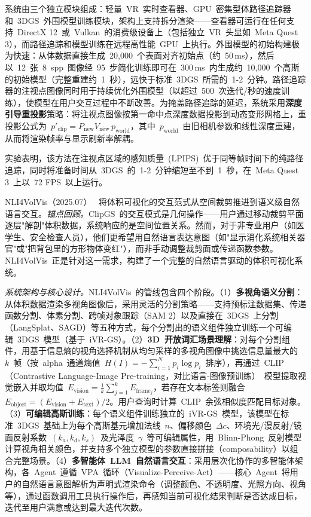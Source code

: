系统由三个独立模块组成：轻量~VR~实时查看器、GPU~密集型体路径追踪器和~3DGS~外围模型训练模块，架构上支持拆分渲染——查看器可运行在任何支持~DirectX 12~或~Vulkan~的消费级设备上（包括独立~VR~头显如~Meta Quest 3），而路径追踪和模型训练在远程高性能~GPU~上执行。外围模型的初始构建极为快速：从体数据直接生成~20,000~个表面对齐初始点（约~50\,ms），然后以~12~张~8~spp~图像经~95~步简化训练即可在~300\,ms~内生成约~10,000~个高斯的初始模型（完整重建约~1~秒），远快于标准~3DGS~所需的~1-2~分钟。路径追踪器的注视点图像同时用于持续优化外围模型（以超过~500~次迭代/秒的速度训练），使模型在用户交互过程中不断改善。为掩盖路径追踪的延迟，系统采用\textbf{深度引导重投影}策略：将注视点图像按第一命中点深度数据投影到动态变形网格上，重投影公式为~$p'_{\text{clip}} = P_{\text{new}}V_{\text{new}}\,p_{\text{world}}$，其中~$p_{\text{world}}$~由旧相机参数和线性深度重建，从而将渲染帧率与显示刷新率解耦。

实验表明，该方法在注视点区域的感知质量~(LPIPS)~优于同等帧时间下的纯路径追踪，同时将准备时间从~3DGS~的~1-2~分钟缩短至不到~1~秒，在~Meta Quest 3~上以~72 FPS~以上运行。

NLI4VolVis（2025.07）~\cite{2507_12621} 将体积可视化的交互范式从空间裁剪推进到语义级自然语言交互。\textit{锚点回顾。}ClipGS~的交互模式是几何操作——用户通过移动裁剪平面逐层"解剖"体积数据，系统响应的是空间位置关系。然而，对于非专业用户（如医学生、安全检查人员），他们更希望用自然语言表达意图（如"显示消化系统相关器官"或"把背包里的方形物体变红"），而非手动调整裁剪面或传递函数参数。NLI4VolVis~正是针对这一需求，构建了一个完整的自然语言驱动的体积可视化系统。

\textit{系统架构与核心设计。}NLI4VolVis~的管线包含四个阶段。（1）\textbf{多视角语义分割}：从体积数据渲染多视角图像后，采用灵活的分割策略——支持预标注数据集、传递函数分割、体素分割、跨帧对象跟踪（SAM 2）以及直接在~3DGS~上分割（LangSplat、SAGD）等五种方式，每个分割出的语义组件独立训练一个可编辑~3DGS~模型（基于~iVR-GS）。（2）\textbf{3D~开放词汇场景理解}：对每个分割组件，用基于信息熵的视角选择机制从均匀采样的多视角图像中挑选信息量最大的~$k$~帧（按~alpha~通道熵值~$H(I)=-\sum_{i=1}^{N} p_i \log p_i$~排序），再通过~CLIP（Contrastive Language-Image Pre-training，对比语言-图像预训练）~模型提取视觉嵌入并取均值~$E_{\text{vision}} = \frac{1}{k}\sum_{j=1}^{k} E_{\text{frame}_j}$，若存在文本标签则融合~$E_{\text{object}} = (E_{\text{vision}} + E_{\text{text}})/2$。用户查询时计算~CLIP~余弦相似度匹配目标对象。（3）\textbf{可编辑高斯训练}：每个语义组件训练独立的~iVR-GS~模型，该模型在标准~3DGS~基础上为每个高斯基元增加法线~$n$、偏移颜色~$\Delta c$、环境光/漫反射/镜面反射系数~$(k_a, k_d, k_s)$~及光泽度~$\gamma$~等可编辑属性，用~Blinn-Phong~反射模型计算视角相关颜色，并支持多个独立模型的参数直接拼接（composability）以组合完整场景。（4）\textbf{多智能体~LLM~自然语言交互}：采用层次化协作的多智能体架构，各~Agent~遵循~VPA~循环（Visualize-Perceive-Act）——核心~Agent~将用户的自然语言意图解析为声明式渲染命令（调整颜色、不透明度、光照方向、视角等），通过函数调用工具执行操作后，再感知当前可视化结果判断是否达成目标，迭代至用户满意或达到最大迭代次数。

